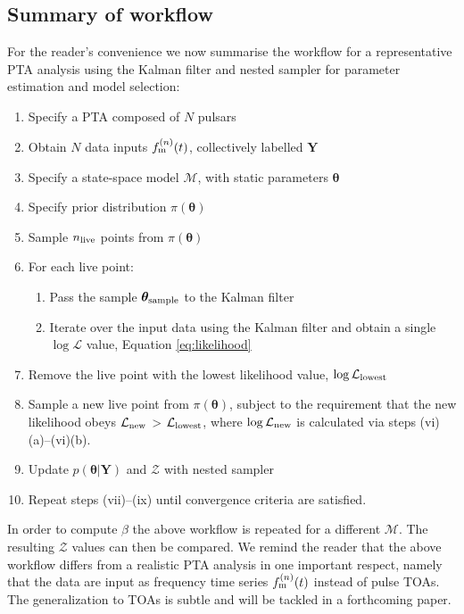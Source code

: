 \documentclass[fleqn,usenatbib,useAMS]{mnras}
\begin{document}
\subsection{Summary of workflow}\label{sec:methodsummary}
For the reader's convenience we now summarise the workflow for a representative PTA analysis using the Kalman filter and nested sampler for parameter estimation and model selection:
\begin{enumerate}[leftmargin=2em]
	\item Specify a PTA composed of $N$ pulsars 
	\item Obtain $N$ data inputs $f_{\rm m}^{(n)}(t)$, collectively labelled $\boldsymbol{Y}$
	\item Specify a state-space model $\mathcal{M}$, with static parameters $\boldsymbol{\theta}$
	\item Specify prior distribution $\pi(\boldsymbol{\theta})$
	 \item Sample $n_{\rm live}$ points from $\pi(\boldsymbol{\theta})$ 
	 \item For each live point:
\begin{enumerate}[leftmargin=2em]
	\item Pass the sample $\boldsymbol{\theta}_{\rm sample}$ to the Kalman filter
	\item Iterate over the input data using the Kalman filter and obtain a single $\log \mathcal{L}$ value, Equation \eqref{eq:likelihood}
\end{enumerate}
	\item Remove the live point with the lowest likelihood value, $\log \mathcal{L}_{\rm lowest}$
	\item Sample a new live point from $\pi(\boldsymbol{\theta})$, subject to the requirement that the new likelihood obeys $\mathcal{L}_{\rm new}$ > $\mathcal{L}_{\rm lowest}$, where $\log \mathcal{L}_{\rm new}$ is calculated via steps (vi)(a)--(vi)(b).
	\item Update $p\left(\boldsymbol{\theta}|\boldsymbol{Y}\right)$ and $\mathcal{Z}$ with nested sampler
	\item Repeat steps (vii)--(ix) until convergence criteria are satisfied.
\end{enumerate}
In order to compute $\beta$ the above workflow is repeated for a different $\mathcal{M}$. The resulting $\mathcal{Z}$ values can then be compared. We remind the reader that the above workflow differs from a realistic PTA analysis in one important respect, namely that the data are input as frequency time series $f_{\rm m}^{(n)}(t)$ instead of pulse TOAs. The generalization to TOAs is subtle and will be tackled in a forthcoming paper.
\end{document}
